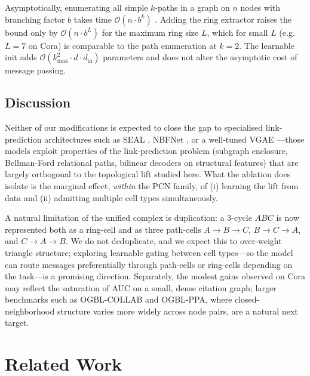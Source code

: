 \documentclass[letterpaper]{article} %
\begin{document}
Asymptotically, enumerating all simple \(k\)-paths in a graph on \(n\) nodes with branching factor \(b\) takes time \(\mathcal{O}(n \cdot b^k)\) \cite{michel_expressive_2023, truong_weisfeiler_2024}. Adding the ring extractor raises the bound only by \(\mathcal{O}(n \cdot b^L)\) for the maximum ring size \(L\), which for small \(L\) (e.g.\ \(L = 7\) on Cora) is comparable to the path enumeration at \(k = 2\). The learnable init adds \(\mathcal{O}(k_\text{max}^2 \cdot d \cdot d_\text{in})\) parameters and does not alter the asymptotic cost of message passing.

\subsection{Discussion} \label{subsec:discussion}
Neither of our modifications is expected to close the gap to specialised link-prediction architectures such as SEAL \cite{zhang_link_2018}, NBFNet \cite{zhu_neural_2021}, or a well-tuned VGAE \cite{kipf_variational_2016}---those models exploit properties of the link-prediction problem (subgraph enclosure, Bellman-Ford relational paths, bilinear decoders on structural features) that are largely orthogonal to the topological lift studied here. What the ablation does isolate is the marginal effect, \emph{within} the PCN family, of (i) learning the lift from data and (ii) admitting multiple cell types simultaneously.

A natural limitation of the unified complex is duplication: a \(3\)-cycle \(ABC\) is now represented both as a ring-cell and as three path-cells \(A{\to}B{\to}C\), \(B{\to}C{\to}A\), and \(C{\to}A{\to}B\). We do not deduplicate, and we expect this to over-weight triangle structure; exploring learnable gating between cell types---so the model can route messages preferentially through path-cells or ring-cells depending on the task---is a promising direction. Separately, the modest gains observed on Cora may reflect the saturation of AUC on a small, dense citation graph; larger benchmarks such as OGBL-COLLAB and OGBL-PPA, where closed-neighborhood structure varies more widely across node pairs, are a natural next target.

\section{Related Work} \label{section:related}
\end{document}
